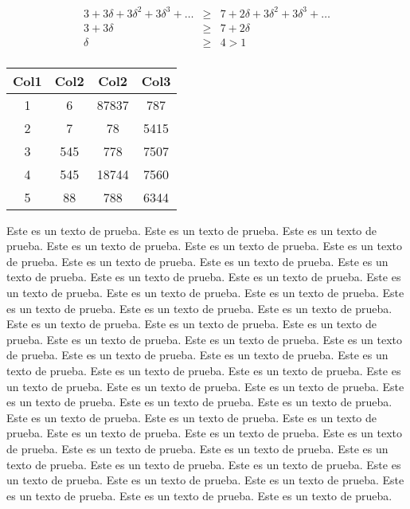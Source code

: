 \documentclass[12pt]{article}
\begin{document}
\begin{landscape}
\begin{minipage}{0.5\linewidth}
\begin{eqnarray*}
3+3\delta+ 3\delta^2+3\delta^3+\dots&\geq&7+2\delta+ 3\delta^2+3\delta^3+\dots\\
3+3\delta&\geq&7+2\delta\\
\delta&\geq&4>1\\
\end{eqnarray*}
\begin{center}
\begin{tabular}{||c c c c||} 
 \hline
 Col1 & Col2 & Col2 & Col3 \\ [0.5ex] 
 \hline\hline
 1 & 6 & 87837 & 787 \\ 
 2 & 7 & 78 & 5415 \\
 3 & 545 & 778 & 7507 \\
 4 & 545 & 18744 & 7560 \\
 5 & 88 & 788 & 6344 \\ [1ex] 
 \hline
\end{tabular}
\end{center}
\end{minipage}
\begin{minipage}{0.5\linewidth}
\begin{multicols}{2}
Este es un texto de prueba. Este es un texto de prueba. Este es un texto de prueba. Este es un texto de prueba. Este es un texto de prueba. Este es un texto de prueba. Este es un texto de prueba. Este es un texto de prueba. Este es un texto de prueba. Este es un texto de prueba. Este es un texto de prueba. Este es un texto de prueba. Este es un texto de prueba. Este es un texto de prueba. Este es un texto de prueba. Este es un texto de prueba. Este es un texto de prueba. Este es un texto de prueba. Este es un texto de prueba. Este es un texto de prueba. Este es un texto de prueba. Este es un texto de prueba. Este es un texto de prueba. Este es un texto de prueba. Este es un texto de prueba. Este es un texto de prueba. Este es un texto de prueba. Este es un texto de prueba. Este es un texto de prueba. Este es un texto de prueba. Este es un texto de prueba. Este es un texto de prueba. Este es un texto de prueba. Este es un texto de prueba. Este es un texto de prueba. Este es un texto de prueba. Este es un texto de prueba. Este es un texto de prueba. Este es un texto de prueba. Este es un texto de prueba. Este es un texto de prueba. Este es un texto de prueba. Este es un texto de prueba. Este es un texto de prueba. Este es un texto de prueba. Este es un texto de prueba. Este es un texto de prueba. Este es un texto de prueba. Este es un texto de prueba. Este es un texto de prueba. Este es un texto de prueba. 
\end{multicols}
\end{minipage}
\end{landscape}
\end{document}
